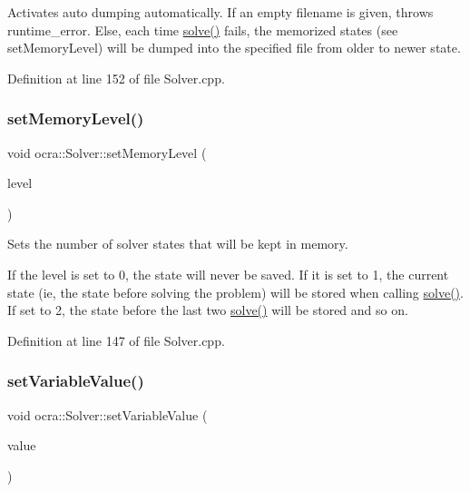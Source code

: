 Activates auto dumping automatically. If an empty filename is given, throws runtime\+\_\+error. Else, each time \hyperlink{classocra_1_1Solver_a86151fea09399da16d6ce47abb1ba904}{solve()} fails, the memorized states (see set\+Memory\+Level) will be dumped into the specified file from older to newer state. 

Definition at line 152 of file Solver.\+cpp.

\hypertarget{classocra_1_1Solver_a173cf07771133096beec4a7d5aefe00d}{}\label{classocra_1_1Solver_a173cf07771133096beec4a7d5aefe00d} 
\subsubsection{\texorpdfstring{set\+Memory\+Level()}{setMemoryLevel()}}
{\footnotesize\ttfamily void ocra\+::\+Solver\+::set\+Memory\+Level (\begin{DoxyParamCaption}\item[{int}]{level }\end{DoxyParamCaption})}

Sets the number of solver states that will be kept in memory.

If the level is set to 0, the state will never be saved. If it is set to 1, the current state (ie, the state before solving the problem) will be stored when calling \hyperlink{classocra_1_1Solver_a86151fea09399da16d6ce47abb1ba904}{solve()}. If set to 2, the state before the last two \hyperlink{classocra_1_1Solver_a86151fea09399da16d6ce47abb1ba904}{solve()} will be stored and so on. 

Definition at line 147 of file Solver.\+cpp.

\hypertarget{classocra_1_1Solver_ac67fe8faaf3355f3430b5fed881832fe}{}\label{classocra_1_1Solver_ac67fe8faaf3355f3430b5fed881832fe} 
\subsubsection{\texorpdfstring{set\+Variable\+Value()}{setVariableValue()}}
{\footnotesize\ttfamily void ocra\+::\+Solver\+::set\+Variable\+Value (\begin{DoxyParamCaption}\item[{const Vector\+Xd \&}]{value }\end{DoxyParamCaption})\hspace{0.3cm}{\ttfamily [inline]}}



